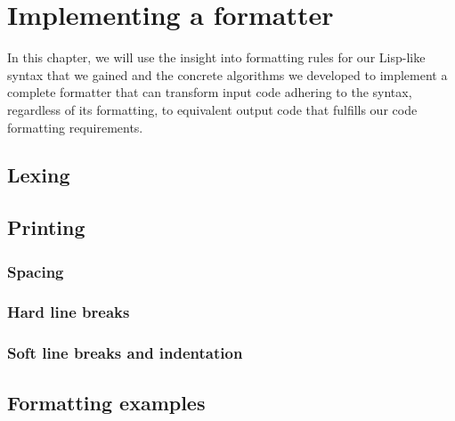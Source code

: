 \chapter{Implementing a formatter}
In this chapter, we will use the insight into formatting rules for our Lisp-like syntax that we gained
and the concrete algorithms we developed to implement a complete formatter that can transform
input code adhering to the syntax, regardless of its formatting, to
equivalent output code that fulfills our code formatting requirements.

\section{Lexing}

\section{Printing}

\subsection{Spacing}

\subsection{Hard line breaks}

\subsection{Soft line breaks and indentation}

\section{Formatting examples}
